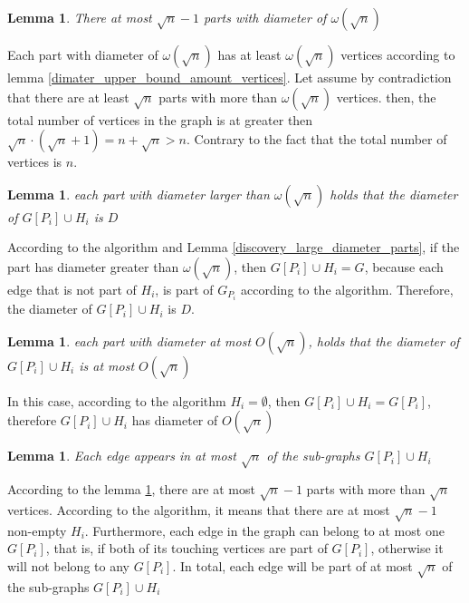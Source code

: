 \documentclass[11pt]{article}
\newtheorem{lemma}[theorem]{Lemma}
\begin{document}
\begin{lemma}
\label{parts_bound_amount}
There at most $\sqrt{n} -1 $ parts with diameter of $\omega(\sqrt{n})$
\end{lemma}
Each part with diameter of $\omega(\sqrt{n})$ has at least $\omega(\sqrt{n})$ vertices according to lemma \ref{dimater_upper_bound_amount_vertices}.
Let assume by contradiction that there are at least $\sqrt{n}$ parts with more than $\omega(\sqrt{n})$ vertices. then, the total number of vertices in the graph is at greater then $\sqrt{n}  \cdot  (\sqrt{n} +1 )= n + \sqrt{n} > n$. Contrary to the fact that the total number of vertices is $n$.


\begin{lemma}
\label{parts_dimater_D}
each part with diameter larger than $\omega(\sqrt{n})$ holds that the diameter of $G[P_i] \cup H_i$ is $D$
\end{lemma}
According to the algorithm and Lemma \ref{discovery_large_diameter_parts}, if the part has diameter greater than $\omega({\sqrt{n}})$, then $G[P_i] \cup H_i = G$, because each edge that is not part of $H_i$, is part of $G_{P_{i}}$ according to the algorithm. Therefore, the diameter of $G[P_i] \cup H_i$ is $D$.


\begin{lemma}
\label{parts_dimater_sqrt_n}
each part with diameter at most $O(\sqrt{n})$, holds that the diameter of $G[P_i] \cup H_i$ is at most $O(\sqrt{n})$
\end{lemma}
In this case, according to the algorithm $H_i = \emptyset$, then $G[P_i] \cup H_i = G[P_i]$, therefore $G[P_i] \cup H_i$ has diameter of $O(\sqrt{n})$


\begin{lemma}
\label{edges_bound}
Each edge appears in at most $\sqrt{n}$ of the sub-graphs $G[P_i] \cup H_i$
\end{lemma}
According to the lemma \ref{parts_bound_amount}, there are at most $\sqrt{n} -1$ parts with more than $\sqrt{n}$ vertices. According to the algorithm, it means that there are at most $\sqrt{n}-1$ non-empty $H_i$. Furthermore, each edge in the graph can belong to at most one $G[P_i]$, that is, if both of its touching vertices are part of $G[P_i]$, otherwise it will not belong to any $G[P_i]$.
In total, each edge will be part of at most $\sqrt{n}$ of the sub-graphs $G[P_i] \cup H_i$

\end{document}
